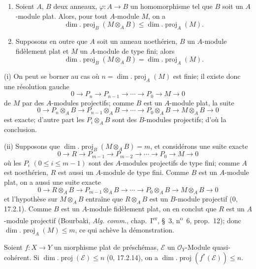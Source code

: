 \begin{proposition}[6.2.1]
\label{IV.2.s6.2.1-fr}
\begin{enumerate}
\item[(i)] Soient $A$, $B$ deux anneaux, $\varphi:A\to B$ un homomorphisme tel
que $B$ soit un $A$-module plat. Alors, pour tout $A$-module $M$, on a
\begin{equation}
\dim.\operatorname{proj}_B(M\otimes_AB)
\leq\dim.\operatorname{proj}_A(M).
\tag{6.2.1.1}\label{IV.2.s6.2.1.1-fr}
\end{equation}
\item[(ii)] Supposons en outre que $A$ soit un anneau noethérien, $B$ un
$A$-module fidèlement plat et $M$ un $A$-module de type fini; alors
\begin{equation}
\dim.\operatorname{proj}_B(M\otimes_AB)
=\dim.\operatorname{proj}_A(M).
\tag{6.2.1.2}\label{IV.2.s6.2.1.2-fr}
\end{equation}
\end{enumerate}
\end{proposition}

(i) On peut se borner au cas où
$n=\dim.\operatorname{proj}_A(M)$ est finie; il existe donc une résolution
gauche
\[
0\to P_n\to P_{n-1}\to\cdots\to P_0\to M\to0
\]
de $M$ par des $A$-modules projectifs; comme $B$ est un $A$-module plat, la
suite
\[
0\to P_n\otimes_AB\to P_{n-1}\otimes_AB\to\cdots\to
P_0\otimes_AB\to M\otimes_AB\to0
\]
est exacte; d'autre part les $P_i\otimes_AB$ sont des $B$-modules projectifs;
d'où la conclusion.

(ii) Supposons que $\dim.\operatorname{proj}_B(M\otimes_AB)=m$, et considérons
une suite exacte
\[
0\to R\to P_{m-1}\to P_{m-2}\to\cdots\to P_0\to M\to0
\]
où les $P_i$ $(0\leq i\leq m-1)$ sont des $A$-modules projectifs de type fini;
comme $A$ est noethérien, $R$ est aussi un $A$-module de type fini. Comme $B$
est un $A$-module plat, on a aussi une suite exacte
\[
0\to R\otimes_AB\to P_{m-1}\otimes_AB\to\cdots\to
P_0\otimes_AB\to M\otimes_AB\to0
\]
et l'hypothèse sur $M\otimes_AB$ entraîne que $R\otimes_AB$ est un $B$-module
projectif (0, 17.2.1). Comme $B$ est un $A$-module fidèlement plat, on en
conclut que $R$ est un $A$-module projectif (Bourbaki, \emph{Alg. comm.},
chap.~I\textsuperscript{er}, §~3, n\textsuperscript{o}~6, prop.~12); donc
$\dim.\operatorname{proj}_A(M)\leq m$, ce qui achève la démonstration.

\begin{corollary}[6.2.2]
\label{IV.2.s6.2.2-fr}
Soient $f:X\to Y$ un morphisme plat de préschémas, $\mathscr E$ un
$\mathcal O_Y$-Module quasi-cohérent. Si
$\dim.\operatorname{proj}(\mathscr E)\leq n$ (0, 17.2.14), on a
$\dim.\operatorname{proj}(f^*(\mathscr E))\leq n$.
\end{corollary}

